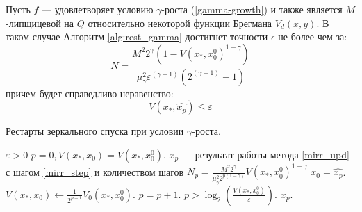 \begin{theorem}
    Пусть $f$ --- удовлетворяет условию $\gamma$-роста (\ref{gamma-growth}) и также является $M$-липщицевой на $Q$ относительно некоторой функции Брегмана $V_d(x, y)$. В таком случае Алгоритм \ref{alg:rest_gamma} достигнет точности $\epsilon$ не более чем за:
    \begin{equation}
       N = \frac{M^2 2^{\gamma}(1 - V(x_*, x_0^0)^{1 - \gamma}) }{\mu_{\gamma}^2 \varepsilon^{(\gamma-1)} (2^{(\gamma-1)} - 1)}
    \end{equation}
    причем будет справедливо неравенство:
    \begin{equation}
       V(x_*, \widehat{x_p}) \leq \varepsilon
    \end{equation}
\end{theorem}

\begin{algorithm}[htp]
   \caption{Рестарты зеркального спуска при условии $\gamma$-роста.}
   \label{alg:rest_gamma}
   \begin{algorithmic}[1]
       \REQUIRE $\varepsilon > 0$
       \STATE $p=0,V(x_*, x_0)=V(x_*,x_0^0)$.
       \REPEAT
       \STATE $x_{p}$ --- результат работы метода \ref{mirr_upd} с шагом \ref{mirr_step} и количеством шагов $N_{p} = \frac{M^2 2^{\gamma}}{\mu_{\gamma}^2 2^{p(1 - \gamma)}} V(x_*, x_0^0)^{1 - \gamma}$
       \STATE $x_0 = \widehat{x_p}$.
       \STATE $V(x_*, x_0) \leftarrow \frac{1}{2^{p+1}}V_{0}(x_*, x_0^0)$.
       \STATE $p=p+1$.
       \UNTIL			
       $p > \log_2\left(\frac{V(x_*, x_0^0)}{\varepsilon}\right).$	
       \ENSURE $x_p$.
   \end{algorithmic}
\end{algorithm}


